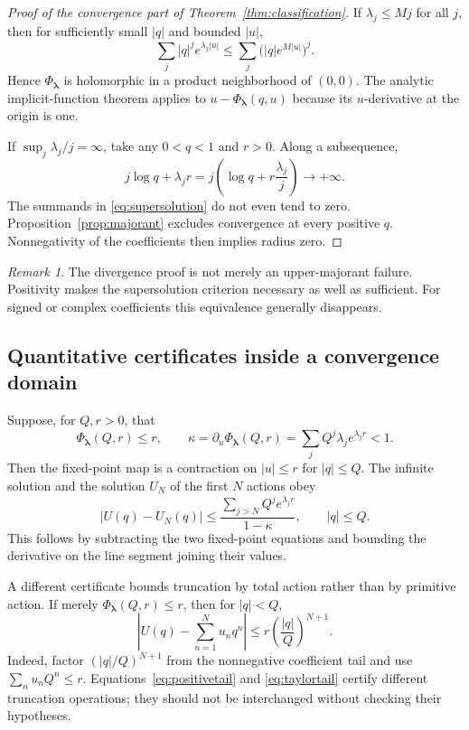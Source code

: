 \documentclass[11pt,a4paper]{article}
\numberwithin{equation}{section}
\theoremstyle{definition}
\theoremstyle{remark}
\newtheorem{remark}[theorem]{Remark}
\newcommand{\lam}{\boldsymbol\lambda}
\newcommand{\PhiL}{\Phi_{\lam}}
\begin{document}
\begin{proof}[Proof of the convergence part of Theorem~\ref{thm:classification}]
If $\lambda_j\le Mj$ for all $j$, then for sufficiently small $|q|$ and
bounded $|u|$,
\[
 \sum_j |q|^j e^{\lambda_j|u|}
 \le\sum_j\bigl(|q|e^{M|u|}\bigr)^j.
\]
Hence $\PhiL$ is holomorphic in a product neighborhood of $(0,0)$.
The analytic implicit-function theorem applies to $u-\PhiL(q,u)$ because
its $u$-derivative at the origin is one.

If $\sup_j\lambda_j/j=\infty$, take any $0<q<1$ and $r>0$.
Along a subsequence,
\[
 j\log q+\lambda_jr
 =j\left(\log q+r\frac{\lambda_j}{j}\right)\longrightarrow+\infty.
\]
The summands in \eqref{eq:supersolution} do not even tend to zero.
Proposition~\ref{prop:majorant} excludes convergence at every positive
$q$.  Nonnegativity of the coefficients then implies radius zero.
\end{proof}

\begin{remark}
The divergence proof is not merely an upper-majorant failure.  Positivity
makes the supersolution criterion necessary as well as sufficient.
For signed or complex coefficients this equivalence generally disappears.
\end{remark}

\subsection{Quantitative certificates inside a convergence domain}
Suppose, for $Q,r>0$, that
\begin{equation}
 \PhiL(Q,r)\le r,
 \qquad
 \kappa=\partial_u\PhiL(Q,r)
       =\sum_jQ^j\lambda_j e^{\lambda_jr}<1.
 \label{eq:contractcertificate}
\end{equation}
Then the fixed-point map is a contraction on $|u|\le r$ for $|q|\le Q$.
The infinite solution and the solution $U_N$ of the first $N$ actions obey
\begin{equation}
 |U(q)-U_N(q)|\le
 \frac{\sum_{j>N}Q^j e^{\lambda_jr}}{1-\kappa},
 \qquad |q|\le Q.
 \label{eq:positivetail}
\end{equation}
This follows by subtracting the two fixed-point equations and bounding
the derivative on the line segment joining their values.

A different certificate bounds truncation by total action rather than by
primitive action.  If merely $\PhiL(Q,r)\le r$, then for $|q|<Q$,
\begin{equation}
 \left|U(q)-\sum_{n=1}^Nu_nq^n\right|
 \le r\left(\frac{|q|}{Q}\right)^{N+1}.
 \label{eq:taylortail}
\end{equation}
Indeed, factor $(|q|/Q)^{N+1}$ from the nonnegative coefficient tail and use
$\sum_nu_nQ^n\le r$.  Equations~\eqref{eq:positivetail} and
\eqref{eq:taylortail} certify different truncation operations; they should
not be interchanged without checking their hypotheses.
\end{document}
